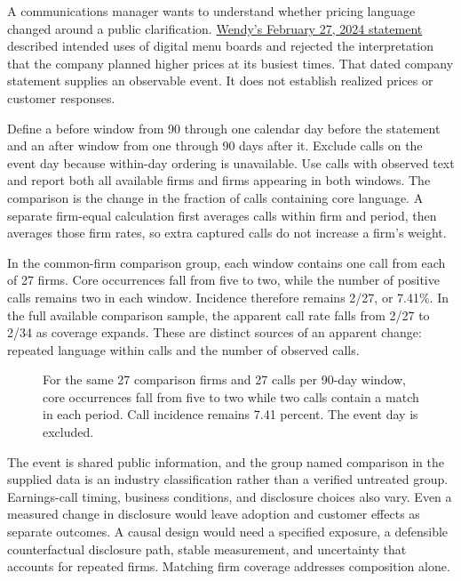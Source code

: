 \noindent \noindent A communications manager wants to understand whether pricing
language changed around a public clarification.
\href{https://www.wendys.com/blog/wendys-digital-news-update}{Wendy's
February 27, 2024 statement} described intended uses of digital menu
boards and rejected the interpretation that the company planned higher
prices at its busiest times. That dated company statement supplies an
observable event. It does not establish realized prices or customer
responses.

Define a before window from 90 through one calendar day before the
statement and an after window from one through 90 days after it. Exclude
calls on the event day because within-day ordering is unavailable. Use
calls with observed text and report both all available firms and firms
appearing in both windows. The comparison is the change in the fraction
of calls containing core language. A separate firm-equal calculation
first averages calls within firm and period, then averages those firm
rates, so extra captured calls do not increase a firm's weight.

In the common-firm comparison group, each window contains one call from
each of 27 firms. Core occurrences fall from five to two, while the
number of positive calls remains two in each window. Incidence therefore
remains 2/27, or 7.41\%. In the full available comparison sample, the
apparent call rate falls from 2/27 to 2/34 as coverage expands. These
are distinct sources of an apparent change: repeated language within
calls and the number of observed calls.

\begin{figure}[htbp]
\centering

\caption{For the same 27 comparison firms and 27 calls per 90-day window, core occurrences fall from five to two while two calls contain a match in each period. Call incidence remains 7.41 percent. The event day is excluded.}\label{fig:M06_calls_windows}
\end{figure}

The event is shared public information, and the group named comparison
in the supplied data is an industry classification rather than a
verified untreated group. Earnings-call timing, business conditions, and
disclosure choices also vary. Even a measured change in disclosure would
leave adoption and customer effects as separate outcomes. A causal
design would need a specified exposure, a defensible counterfactual
disclosure path, stable measurement, and uncertainty that accounts for
repeated firms. Matching firm coverage addresses composition alone.

